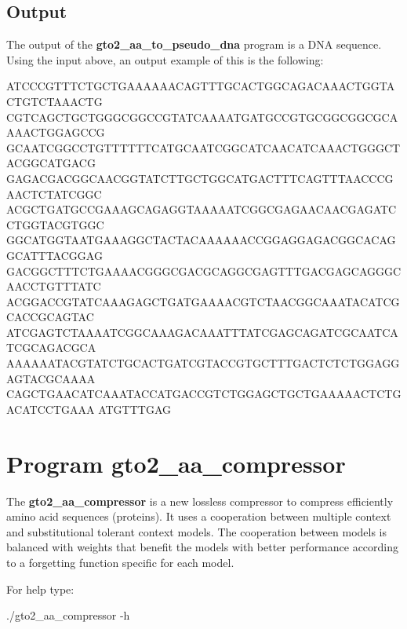 \documentclass[11pt,]{krantz}
\newenvironment{Shaded}{\begin{snugshade}}{\end{snugshade}}
\newcommand{\ExtensionTok}[1]{#1}
\newcommand{\NormalTok}[1]{#1}
\begin{document}
\subsection*{Output}\label{output-28}


The output of the \textbf{gto2\_aa\_to\_pseudo\_dna} program is a DNA
sequence. Using the input above, an output example of this is the
following:

\begin{Shaded}
\begin{Highlighting}[]
\ExtensionTok{ATCCCGTTTCTGCTGAAAAAACAGTTTGCACTGGCAGACAAACTGGTACTGTCTAAACTG}
\ExtensionTok{CGTCAGCTGCTGGGCGGCCGTATCAAAATGATGCCGTGCGGCGGCGCAAAACTGGAGCCG}
\ExtensionTok{GCAATCGGCCTGTTTTTTCATGCAATCGGCATCAACATCAAACTGGGCTACGGCATGACG}
\ExtensionTok{GAGACGACGGCAACGGTATCTTGCTGGCATGACTTTCAGTTTAACCCGAACTCTATCGGC}
\ExtensionTok{ACGCTGATGCCGAAAGCAGAGGTAAAAATCGGCGAGAACAACGAGATCCTGGTACGTGGC}
\ExtensionTok{GGCATGGTAATGAAAGGCTACTACAAAAAACCGGAGGAGACGGCACAGGCATTTACGGAG}
\ExtensionTok{GACGGCTTTCTGAAAACGGGCGACGCAGGCGAGTTTGACGAGCAGGGCAACCTGTTTATC}
\ExtensionTok{ACGGACCGTATCAAAGAGCTGATGAAAACGTCTAACGGCAAATACATCGCACCGCAGTAC}
\ExtensionTok{ATCGAGTCTAAAATCGGCAAAGACAAATTTATCGAGCAGATCGCAATCATCGCAGACGCA}
\ExtensionTok{AAAAAATACGTATCTGCACTGATCGTACCGTGCTTTGACTCTCTGGAGGAGTACGCAAAA}
\ExtensionTok{CAGCTGAACATCAAATACCATGACCGTCTGGAGCTGCTGAAAAACTCTGACATCCTGAAA}
\ExtensionTok{ATGTTTGAG}
\end{Highlighting}
\end{Shaded}

\section{Program gto2\_aa\_compressor}\label{program-gto2_aa_compressor}

The \textbf{gto2\_aa\_compressor} is a new lossless compressor to
compress efficiently amino acid sequences (proteins). It uses a
cooperation between multiple context and substitutional tolerant context
models. The cooperation between models is balanced with weights that
benefit the models with better performance according to a forgetting
function specific for each model.

For help type:

\begin{Shaded}
\begin{Highlighting}[]
\ExtensionTok{./gto2_aa_compressor}\NormalTok{ -h}
\end{Highlighting}
\end{Shaded}
\end{document}
